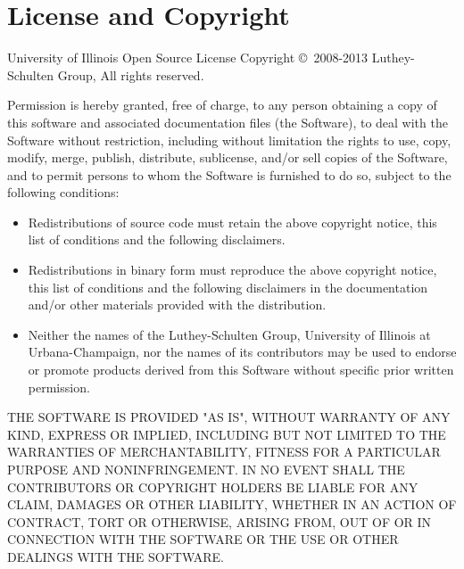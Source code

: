 \chapter{License and Copyright}

University of Illinois Open Source License\newline
Copyright 	\copyright~2008-2013 Luthey-Schulten Group, All rights reserved.\newline

Permission is hereby granted, free of charge, to any person obtaining a copy of
this software and associated documentation files (the Software), to deal with 
the Software without restriction, including without limitation the rights to 
use, copy, modify, merge, publish, distribute, sublicense, and/or sell copies 
of the Software, and to permit persons to whom the Software is furnished to 
do so, subject to the following conditions:

\begin{itemize}
\item Redistributions of source code must retain the above copyright notice, 
 this list of conditions and the following disclaimers.
 \item Redistributions in binary form must reproduce the above copyright notice, 
this list of conditions and the following disclaimers in the documentation 
 and/or other materials provided with the distribution.
 \item Neither the names of the Luthey-Schulten Group, University of Illinois at
Urbana-Champaign, nor the names of its contributors may be used to endorse or
promote products derived from this Software without specific prior written
permission.
\end{itemize}

THE SOFTWARE IS PROVIDED "AS IS", WITHOUT WARRANTY OF ANY KIND, EXPRESS OR 
IMPLIED, INCLUDING BUT NOT LIMITED TO THE WARRANTIES OF MERCHANTABILITY, 
FITNESS FOR A PARTICULAR PURPOSE AND NONINFRINGEMENT.  IN NO EVENT SHALL 
THE CONTRIBUTORS OR COPYRIGHT HOLDERS BE LIABLE FOR ANY CLAIM, DAMAGES OR 
OTHER LIABILITY, WHETHER IN AN ACTION OF CONTRACT, TORT OR OTHERWISE, 
ARISING FROM, OUT OF OR IN CONNECTION WITH THE SOFTWARE OR THE USE OR 
OTHER DEALINGS WITH THE SOFTWARE.

